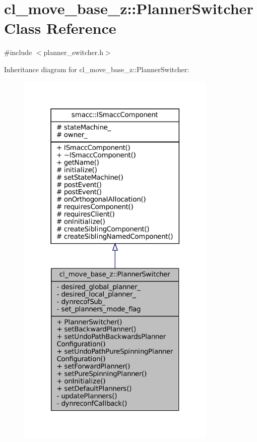 \hypertarget{classcl__move__base__z_1_1PlannerSwitcher}{}\section{cl\+\_\+move\+\_\+base\+\_\+z\+:\+:Planner\+Switcher Class Reference}
\label{classcl__move__base__z_1_1PlannerSwitcher}


{\ttfamily \#include $<$planner\+\_\+switcher.\+h$>$}



Inheritance diagram for cl\+\_\+move\+\_\+base\+\_\+z\+:\+:Planner\+Switcher\+:
\nopagebreak
\begin{figure}[H]
\begin{center}
\leavevmode
\includegraphics[width=271pt]{classcl__move__base__z_1_1PlannerSwitcher__inherit__graph}
\end{center}
\end{figure}


